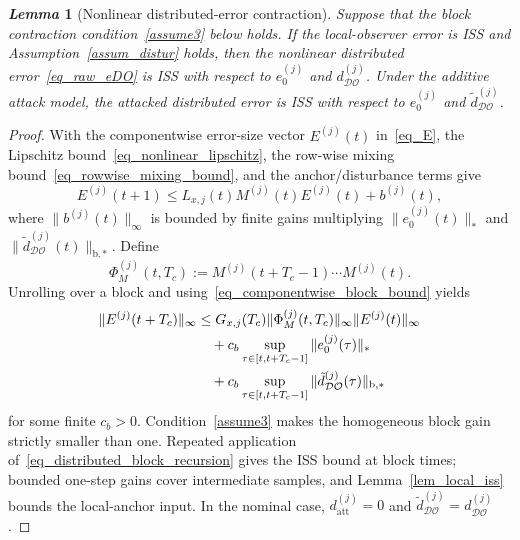 \documentclass[letterpaper,journal]{IEEEtran}
\def\DO{\mathcal{DO}} %
\newtheorem{lemma}{\it Lemma}%
\begin{document}
\begin{lemma}[Nonlinear distributed-error contraction]\label{lem_dist_contraction}
Suppose that the block contraction condition~\eqref{assume3} below holds. If the local-observer error is ISS and Assumption~\ref{assum_distur} holds, then the nonlinear distributed error~\eqref{eq_raw_eDO} is ISS with respect to $e_0^{(j)}$ and $d_{\DO}^{(j)}$. Under the additive attack model, the attacked distributed error is ISS with respect to $e_0^{(j)}$ and $\tilde d_{\DO}^{(j)}$.
\end{lemma}
\begin{proof}
With the componentwise error-size vector $E^{(j)}(t)$ in~\eqref{eq_E}, the Lipschitz bound~\eqref{eq_nonlinear_lipschitz}, the row-wise mixing bound~\eqref{eq_rowwise_mixing_bound}, and the anchor/disturbance terms give
\begin{equation}
E^{(j)}(t+1)
\le L_{x,j}(t)M^{(j)}(t)E^{(j)}(t)+b^{(j)}(t),
\label{eq_componentwise_input_recursion}
\end{equation}
where $\|b^{(j)}(t)\|_\infty$ is bounded by finite gains multiplying $\|e_0^{(j)}(t)\|_*$ and $\|\tilde d_{\DO}^{(j)}(t)\|_{\mathrm{b},*}$. Define
\begin{equation}
\Phi_M^{(j)}(t,T_c)
:=M^{(j)}(t+T_c-1)\cdots M^{(j)}(t).
\label{eq_block_mixing_product}
\end{equation}
Unrolling over a block and using~\eqref{eq_componentwise_block_bound} yields
\begin{align}
\|E^{(j)}(t+T_c)\|_\infty
&\le G_{x,j}(T_c)
\|\Phi_M^{(j)}(t,T_c)\|_\infty
\|E^{(j)}(t)\|_\infty\notag\\
&\quad+c_b\sup_{\tau\in[t,t+T_c-1]}
\|e_0^{(j)}(\tau)\|_*\notag\\
&\quad+c_b\sup_{\tau\in[t,t+T_c-1]}
\|\tilde d_{\DO}^{(j)}(\tau)\|_{\mathrm{b},*}
\label{eq_distributed_block_recursion}
\end{align}
for some finite $c_b>0$. Condition~\eqref{assume3} makes the homogeneous block gain strictly smaller than one. Repeated application of~\eqref{eq_distributed_block_recursion} gives the ISS bound at block times; bounded one-step gains cover intermediate samples, and Lemma~\ref{lem_local_iss} bounds the local-anchor input. In the nominal case, $d_{\mathrm{att}}^{(j)}=0$ and $\tilde d_{\DO}^{(j)}=d_{\DO}^{(j)}$.
\end{proof}
\end{document}
